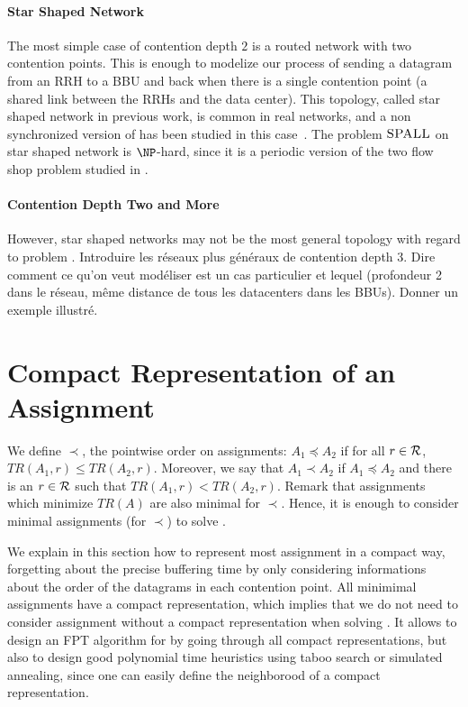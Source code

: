 \documentclass[english]{article}
\begin{document}
\paragraph*{Star Shaped Network}

The most simple case of contention depth $2$ is a routed network with two contention points. 
This is enough to modelize our process of sending a datagram from an RRH to a BBU and back when
there is a single contention point (a shared link between the RRHs and the data center). 
This topology, called star shaped network in previous work, is common in real networks, and a non synchronized version of \spall has been studied in this case~\cite{nosdeuxarticles}.
The problem $\textsc{SPALL}$ on star shaped network is $\NP$-hard, since it is a periodic version of 
the two flow shop problem studied in \cite{}. 

\paragraph*{Contention Depth Two and More}

However, star shaped networks may not be the most general topology with regard to problem \spall.
Introduire les réseaux plus généraux de contention depth 3.
Dire comment ce qu'on veut modéliser est un cas particulier et lequel (profondeur 2 dans le réseau, même
distance de tous les datacenters dans les BBUs). Donner un exemple illustré.


\section{Compact Representation of an Assignment}

 We define $\prec$, the pointwise order on assignments: $A_1 \preceq A_2$ if for all $r\in \cal{R}$, $TR(A_1,r) \leq TR(A_2,r)$. Moreover, we say that $A_1 \prec A_2$ if $A_1 \preceq A_2$ and there is an $r \in \cal {R}$ such that  $TR(A_1,r) < TR(A_2,r)$. Remark that assignments which minimize $TR(A)$ are also minimal for $\prec$. Hence, it is enough to consider minimal assignments (for $\prec$) to solve \spall.

We explain in this section how to represent most assignment in a compact way, forgetting about the precise buffering time by only considering informations about the order of the datagrams in each contention point. All minimimal assignments have a compact representation, which implies that we do not need to consider assignment without a compact representation when solving \spall. 
It allows to design an FPT algorithm for \spall by going through all compact representations, but also to design good polynomial time heuristics using taboo search or simulated annealing, since one can easily define the neighborood of a compact representation.
\end{document}
